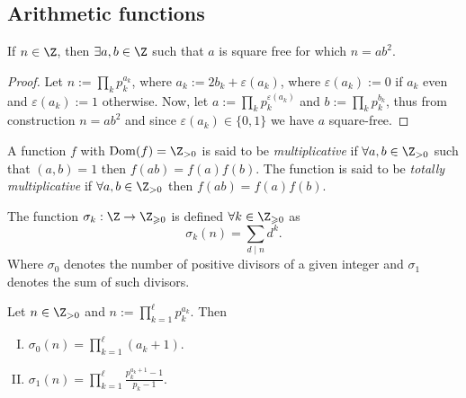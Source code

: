 \subsection{Arithmetic functions}

\begin{proposition}
   If \(n \in \Z\), then \(\exists a, b \in \Z\) such that \(a\)
   is square free for which  \(n = ab^2\).
\end{proposition}

\begin{proof}
   Let \(n := \prod_k p_k^{a_k}\), where \(a_k := 2 b_k + \varepsilon(a_k)\),
   where \(\varepsilon(a_k) := 0\) if \(a_k\) even and \(\varepsilon(a_k) := 1\)
   otherwise. Now, let \(a := \prod_k p_k^{\varepsilon(a_k)}\) and \(b :=
   \prod_k p_k^{b_k}\), thus from construction  \(n = a b^2\) and since
   \(\varepsilon(a_k) \in \{0, 1\}\) we have \(a\) square-free.
\end{proof}

\begin{definition}
   A function \(f\) with \(\mathrm{Dom}(f) = \Z_{>0}\) is said to be
   \emph{multiplicative} if \(\forall a, b \in \Z_{>0}\) such that
   \((a,b) = 1\) then  \(f(ab) = f(a)f(b)\). The function is said to be
   \emph{totally multiplicative} if  \(\forall a, b \in \Z_{>0}\) then
   \(f(ab) = f(a)f(b)\).
\end{definition}

\begin{definition}
   The function \(\sigma_k: \Z \to \Z_{\geqslant 0}\) is defined
   \(\forall k \in \Z_{\geqslant 0}\) as
    \[
       \sigma_k(n) = \sum_{d\mid n} d^k.
   \]
   Where \(\sigma_0\) denotes the number of positive divisors of a given integer
   and \(\sigma_1\) denotes the sum of such divisors.
\end{definition}

\begin{proposition}
   Let \(n \in \Z_{>0}\) and \(n := \prod_{k = 1}^\ell
   p_k^{a_k}\). Then
   \begin{enumerate}[I.]
      \item \(\sigma_0(n) = \prod_{k = 1}^{\ell} (a_k + 1)\).
      \item  \(\sigma_1(n) = \prod_{k=1}^\ell \frac{p_k^{a_k+1} - 1}{p_k - 1}\).
   \end{enumerate}
\end{proposition}

